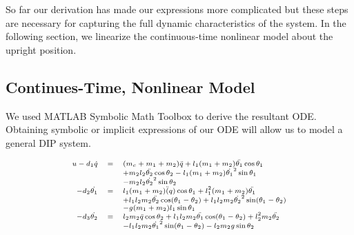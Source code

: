 \documentclass[journal]{IEEEtran}
\begin{document}
So far our derivation has made our expressions more complicated but these steps are
necessary for capturing the full dynamic characteristics of the system. In the
following section, we linearize the continuous-time nonlinear model about the
upright position.

\subsection{Continues-Time, Nonlinear Model}
We used MATLAB Symbolic Math Toolbox to derive the resultant ODE. Obtaining
symbolic or implicit expressions of our ODE will allow us to model a general
DIP system.

\begin{equation}
\text{\scriptsize $
\begin{array}{rcl}
    u -d_1 \dot{q} &=& (m_c+m_1+m_2)\ddot{q}+l_1(m_1+m_2)\ddot{\theta_1} \cos \theta_1\\
    & & + m_2 l_2 \ddot{\theta_2} \cos \theta_2 - l_1 (m_1+m_2) \dot{\theta_1}^2 \sin \theta_1 \\
    & & - m_2 l_2 \dot{\theta_2}^2 \sin \theta_2\\
    -d_2 \dot{\theta_1} &=& l_1 (m_1+m_2) \ddot(q) \cos \theta_1
    +l_1^2 (m_1+m_2) \ddot{\theta_1}\\
    & & +l_1 l_2 m_2 \ddot{\theta_2} \cos (\theta_1 - \theta_2)+ l_1 l_2 m_2 \dot{\theta_2}^2 \sin(\theta_1 - \theta_2) \\
    & & - g(m_1+m_2) l_1 \sin \theta_1 \\
    -d_3 \dot{\theta_2} &=& l_2 m_2 \ddot{q} \cos \theta_2
    + l_1 l_2 m_2 \ddot{\theta_1} \cos (\theta_1 -\theta_2)
    + l_2^2 m_2 \ddot{\theta_2}\\
    & & -l_1 l_2 m_2 \dot{\theta_1}^2 \sin (\theta_1 - \theta_2)
    - l_2 m_2 g \sin \theta_2\\
    \end{array}
$}
\end{equation}

\end{document}
